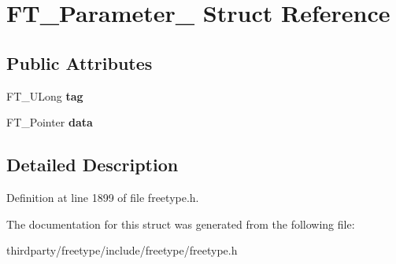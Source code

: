 \hypertarget{struct_f_t___parameter__}{}\section{F\+T\+\_\+\+Parameter\+\_\+ Struct Reference}
\label{struct_f_t___parameter__}
\subsection*{Public Attributes}
\begin{DoxyCompactItemize}
\item 
\mbox{\label{struct_f_t___parameter___a5a53ef2652683a2cd9ee6a0a694cb76b}} 
F\+T\+\_\+\+U\+Long {\bfseries tag}
\item 
\mbox{\label{struct_f_t___parameter___a930c8885bd25be8d054443153c817c13}} 
F\+T\+\_\+\+Pointer {\bfseries data}
\end{DoxyCompactItemize}


\subsection{Detailed Description}


Definition at line 1899 of file freetype.\+h.



The documentation for this struct was generated from the following file\+:\begin{DoxyCompactItemize}
\item 
thirdparty/freetype/include/freetype/freetype.\+h\end{DoxyCompactItemize}
